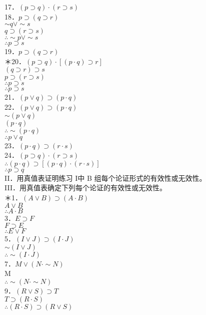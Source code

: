 17．$(p \supset q) \cdot(r \supset s)$\\
18．$p \supset(q \supset r)$\\
$\sim q \vee \sim s$\\
$q \supset(r \supset s)$\\
$\therefore \sim p \vee \sim s$\\
$\therefore p \supset s$\\
19．$p \supset(q \supset r)$\\
＊20．$(p \supset q) \cdot[(p \cdot q) \supset r]$\\
$(q \supset r) \supset s$\\
$p \supset(r \supset s)$\\
$\therefore p \supset s$\\
$\therefore p \supset s$\\
21．$(p \vee q) \supset(p \cdot q)$\\
22．$(p \vee q) \supset(p \cdot q)$\\
$\sim(p \vee q)$\\
$(p \cdot q)$\\
$\therefore \sim(p \cdot q)$\\
$\therefore p \vee q$\\
23．$(p \cdot q) \supset(r \cdot s)$\\
24．$(p \supset q) \cdot(r \supset s)$\\
$\therefore(p \cdot q) \supset[(p \cdot q) \cdot(r \cdot s)]$\\
$\therefore p \supset q$\\
II．用真值表证明练习 I中 B 组每个论证形式的有效性或无效性。\\
III．用真值表确定下列每个论证的有效性或无效性。\\
＊1．$(A \vee B) \supset(A \cdot B)$\\
$A \vee B$\\
$\therefore A \cdot B$\\
3．$E \supset F$\\
$F \supset E$\\
$\therefore E \vee F$\\
5．$(I \vee J) \supset(I \cdot J)$\\
$\sim(I \vee J)$\\
$\therefore \sim(I \cdot J)$\\
7．$M \vee(N \cdot \sim N)$\\
M\\
$\therefore \sim(N \cdot \sim N)$\\
9．$(R \vee S) \supset T$\\
$T \supset(R \cdot S)$\\
$\therefore(R \cdot S) \supset(R \vee S)$

